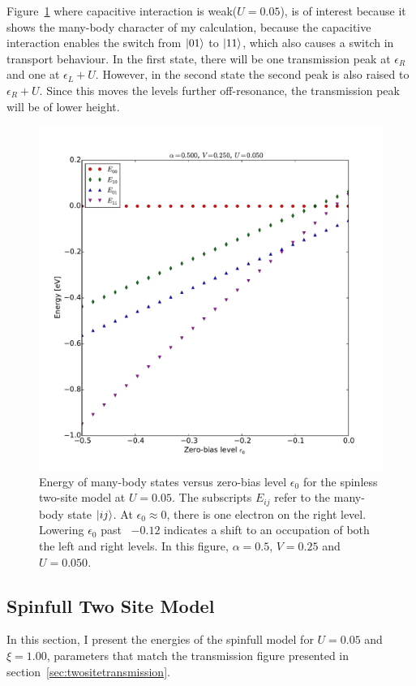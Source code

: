 Figure~\ref{fig:perrinenergy1} where capacitive interaction is weak($U=0.05$), is of interest because it shows the many-body character of my calculation, because the capacitive interaction enables the switch from $\ket{01}$ to $\ket{11}$, which also causes a switch in transport behaviour. In the first state, there will be one transmission peak at $\epsilon_R$ and one at $\epsilon_L + U$. However, in the second state the second peak is also raised to $\epsilon_R+U$. Since this moves the levels further off-resonance, the transmission peak will be of lower height. 
\begin{figure}[bt]
    \centering
    \includegraphics[height=.45\textheight]{pdf/energy/perrin_distribution_u1.pdf}
    \caption{Energy of many-body states versus zero-bias level $\epsilon_0$ for the spinless two-site model at $U=0.05$. The subscripts $E_{ij}$ refer to the many-body state $\ket{i j}$. At $\epsilon_0 \approx 0$, there is one electron on the right level. Lowering $\epsilon_0$ past ~$-0.12$ indicates a shift to an occupation of both the left and right levels. In this figure, $\alpha=0.5$, $V=0.25$ and $U=0.050$.}
    \label{fig:perrinenergy1}
\end{figure} 

 
\subsection{Spinfull Two Site Model} 
In this section, I present the energies of the spinfull model for $U=0.05$ and  $\xi=1.00$, parameters that match the transmission figure presented in section~\ref{sec:twositetransmission}.
 
